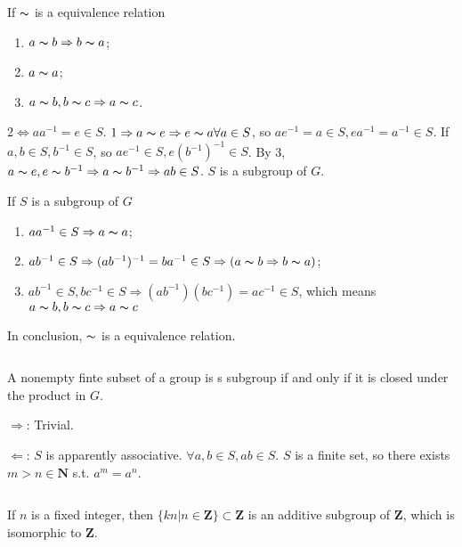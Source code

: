 \begin{answer}
    If $\thicksim$ is a equivalence relation
    \begin{enumerate}
        \item $a\thicksim b\Rightarrow b\thicksim a$;
        \item $a\thicksim a$;
        \item $a\thicksim b, b\thicksim c\Rightarrow a\thicksim c$.
    \end{enumerate}
    $2\Leftrightarrow aa^{-1}=e\in S$. $1\Rightarrow a\thicksim e\Rightarrow e \thicksim a\forall a\in S$, so $ ae^{-1}=a\in S, ea^{-1}=a^{-1}\in S$. If $a,b\in S, b^{-1} \in S$, so $ae^{-1}\in S, e(b^{-1})^{-1}\in S$. By 3, $a\thicksim e, e\thicksim b^{-1}\Rightarrow a\thicksim b^{-1}\Rightarrow ab\in S$. $S$ is a subgroup of $G$.

    If $S$ is a subgroup of $G$
    \begin{enumerate}
        \item $aa^{-1}\in S\Rightarrow a\thicksim a$;
        \item $ab^{-1}\in S\Rightarrow (ab^{-1})^{-1}=ba^{-1}\in S\Rightarrow (a\thicksim b\Rightarrow b\thicksim a)$;
        \item $ab^{-1}\in S,bc^{-1}\in S\Rightarrow (ab^{-1})(bc^{-1})=ac^{-1}\in S$, which means $a\thicksim b,b \thicksim c\Rightarrow a\thicksim c$
    \end{enumerate}
    In conclusion, $\thicksim$ is a equivalence relation.
\end{answer}

$$ $$

\begin{ex}
    A nonempty finte subset of a group is s subgroup if and only if it is closed under the product in $G$.
\end{ex}

\begin{answer}
    $\Rightarrow$: Trivial.

    $\Leftarrow$: $S$ is apparently associative. $\forall a,b\in S, ab\in S$. $S$ is a finite set, so there exists $m>n\in \mathbf{N}$ s.t. $a^{m}=a^{n}$. %
\end{answer}

$$ $$

\begin{ex}
    If $n$ is a fixed integer, then $\{kn | n\in \mathbf{Z}\}\subset\mathbf{Z}$ is an additive subgroup of $\mathbf{Z}$, which is isomorphic to $\mathbf{Z}$. 
\end{ex}

